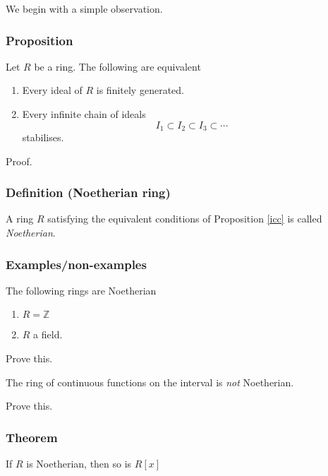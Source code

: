 \documentclass[11pt]{article}
\begin{document}
We begin with a simple observation.
\subsubsection{Proposition}
\label{sec:org7fd7a14}
\label{icc}
    Let \(R\) be a ring. The following are equivalent
\begin{enumerate}
\item Every ideal of \(R\) is finitely generated.
\item Every infinite chain of ideals
\[I_1 \subset I_2 \subset I_3 \subset \cdots\]
stabilises.
\end{enumerate}

\begin{skipped}
Proof.
\end{skipped}

\subsubsection{Definition (Noetherian ring)}
\label{sec:org7feba9e}
A ring \(R\) satisfying the equivalent conditions of Proposition \ref{icc} is called \emph{Noetherian}.

\subsubsection{Examples/non-examples}
\label{sec:orgd24e9ce}
The following rings are Noetherian
\begin{enumerate}
\item \(R = {\mathbb Z}\)
\item \(R\) a field.
\end{enumerate}
\begin{skipped}
Prove this.
\end{skipped}

The ring of continuous functions on the interval is \emph{not} Noetherian.
\begin{skipped}
Prove this.
\end{skipped}

\subsubsection{Theorem}
\label{sec:orga6380c0}
If \(R\) is Noetherian, then so is \(R[x]\)
\end{document}
